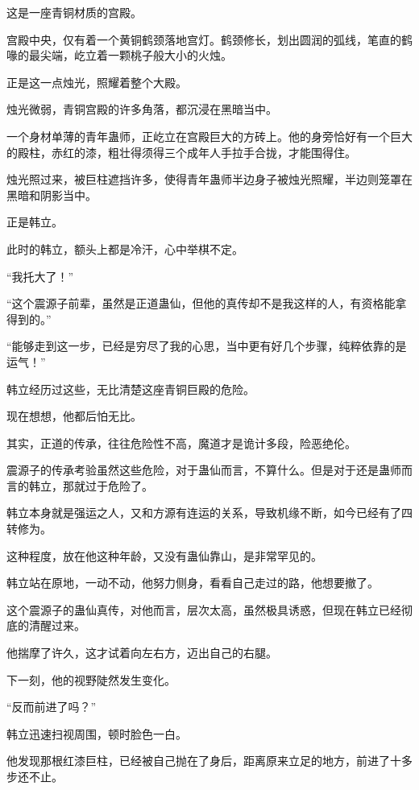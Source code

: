 
\begin{this_body}

这是一座青铜材质的宫殿。

宫殿中央，仅有着一个黄铜鹤颈落地宫灯。鹤颈修长，划出圆润的弧线，笔直的鹤喙的最尖端，屹立着一颗桃子般大小的火烛。

正是这一点烛光，照耀着整个大殿。

烛光微弱，青铜宫殿的许多角落，都沉浸在黑暗当中。

一个身材单薄的青年蛊师，正屹立在宫殿巨大的方砖上。他的身旁恰好有一个巨大的殿柱，赤红的漆，粗壮得须得三个成年人手拉手合拢，才能围得住。

烛光照过来，被巨柱遮挡许多，使得青年蛊师半边身子被烛光照耀，半边则笼罩在黑暗和阴影当中。

正是韩立。

此时的韩立，额头上都是冷汗，心中举棋不定。

“我托大了！”

“这个震源子前辈，虽然是正道蛊仙，但他的真传却不是我这样的人，有资格能拿得到的。”

“能够走到这一步，已经是穷尽了我的心思，当中更有好几个步骤，纯粹依靠的是运气！”

韩立经历过这些，无比清楚这座青铜巨殿的危险。

现在想想，他都后怕无比。

其实，正道的传承，往往危险性不高，魔道才是诡计多段，险恶绝伦。

震源子的传承考验虽然这些危险，对于蛊仙而言，不算什么。但是对于还是蛊师而言的韩立，那就过于危险了。

韩立本身就是强运之人，又和方源有连运的关系，导致机缘不断，如今已经有了四转修为。

这种程度，放在他这种年龄，又没有蛊仙靠山，是非常罕见的。

韩立站在原地，一动不动，他努力侧身，看看自己走过的路，他想要撤了。

这个震源子的蛊仙真传，对他而言，层次太高，虽然极具诱惑，但现在韩立已经彻底的清醒过来。

他揣摩了许久，这才试着向左右方，迈出自己的右腿。

下一刻，他的视野陡然发生变化。

“反而前进了吗？”

韩立迅速扫视周围，顿时脸色一白。

他发现那根红漆巨柱，已经被自己抛在了身后，距离原来立足的地方，前进了十多步还不止。


\end{this_body}
